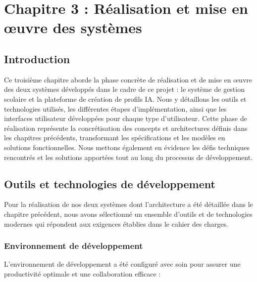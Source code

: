 \chapter*{Chapitre 3 : Réalisation et mise en œuvre des systèmes}
\thispagestyle{fancy}
\setcounter{section}{0}
\newpage

\section{Introduction}

Ce troisième chapitre aborde la phase concrète de réalisation et de mise en œuvre des deux systèmes développés dans le cadre de ce projet : le système de gestion scolaire et la plateforme de création de profils IA. Nous y détaillons les outils et technologies utilisés, les différentes étapes d'implémentation, ainsi que les interfaces utilisateur développées pour chaque type d'utilisateur. Cette phase de réalisation représente la concrétisation des concepts et architectures définis dans les chapitres précédents, transformant les spécifications et les modèles en solutions fonctionnelles. Nous mettons également en évidence les défis techniques rencontrés et les solutions apportées tout au long du processus de développement.

\section{Outils et technologies de développement}
Pour la réalisation de nos deux systèmes dont l'architecture a été détaillée dans le chapitre précédent, nous avons sélectionné un ensemble d'outils et de technologies modernes qui répondent aux exigences établies dans le cahier des charges.

\subsection{Environnement de développement}
L'environnement de développement a été configuré avec soin pour assurer une productivité optimale et une collaboration efficace :

